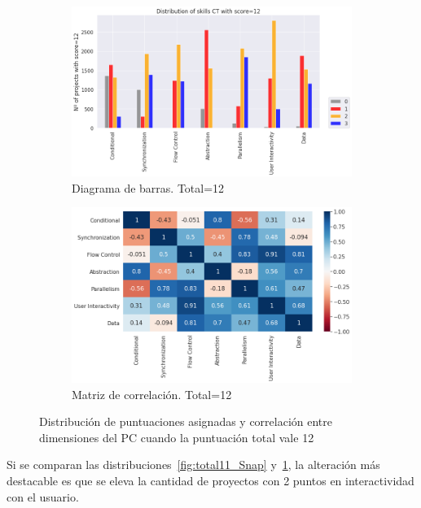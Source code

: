\documentclass[a4paper, 12pt]{book}
\begin{document}
\begin{figure}[H]
    \centering
    \begin{subfigure}[h]{.49\textwidth} 
        \includegraphics[width=\textwidth]{img/distribucion_12_Snap}
        \caption{Diagrama de barras. Total=12}
        \label{fig:total12_Snap}
    \end{subfigure}       
    \begin{subfigure}[h]{.49\textwidth} 
        \includegraphics[width=\textwidth]{img/corr_12_Snap}
        \caption{Matriz de correlación. Total=12}
        \label{fig:corr12_Snap}
    \end{subfigure}
    \caption{Distribución de puntuaciones asignadas y correlación entre dimensiones del PC cuando la puntuación total vale 12}
\end{figure}

Si se comparan las distribuciones~\ref{fig:total11_Snap} y~\ref{fig:total12_Snap}, la alteración más destacable es que se eleva la cantidad de proyectos con 2 puntos en interactividad con el usuario.
\end{document}
